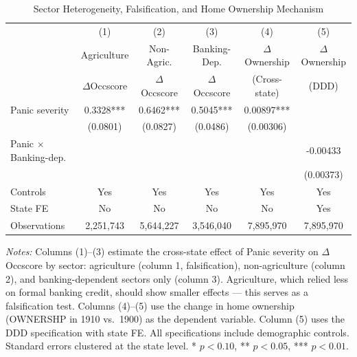 \begin{table}[H]
\centering
\caption{Sector Heterogeneity, Falsification, and Home Ownership Mechanism}
\begin{threeparttable}
\small
\begin{tabular}{lccccc}
\toprule
 & (1) & (2) & (3) & (4) & (5) \\
 & Agriculture & Non-Agric. & Banking-Dep. & $\Delta$Ownership & $\Delta$Ownership \\
 & $\Delta$Occscore & $\Delta$Occscore & $\Delta$Occscore & (Cross-state) & (DDD) \\
\midrule
Panic severity & 0.3328*** & 0.6462*** & 0.5045*** & 0.00897*** & \\
 & (0.0801) & (0.0827) & (0.0486) & (0.00306) & \\
Panic $\times$ Banking-dep. & & & & & -0.00433 \\
 & & & & & (0.00373) \\
\midrule
Controls & Yes & Yes & Yes & Yes & Yes \\
State FE & No & No & No & No & Yes \\
Observations & 2,251,743 & 5,644,227 & 3,546,040 & 7,895,970 & 7,895,970 \\
\bottomrule
\end{tabular}
\begin{tablenotes}[flushleft]
\small
\item \textit{Notes:} Columns (1)--(3) estimate the cross-state effect of Panic severity on $\Delta$Occscore by sector: agriculture (column 1, falsification), non-agriculture (column 2), and banking-dependent sectors only (column 3). Agriculture, which relied less on formal banking credit, should show smaller effects --- this serves as a falsification test. Columns (4)--(5) use the change in home ownership (OWNERSHP in 1910 vs.\ 1900) as the dependent variable. Column (5) uses the DDD specification with state FE. All specifications include demographic controls. Standard errors clustered at the state level. * $p<0.10$, ** $p<0.05$, *** $p<0.01$.
\end{tablenotes}
\end{threeparttable}
\label{tab:mechanism}
\end{table}

